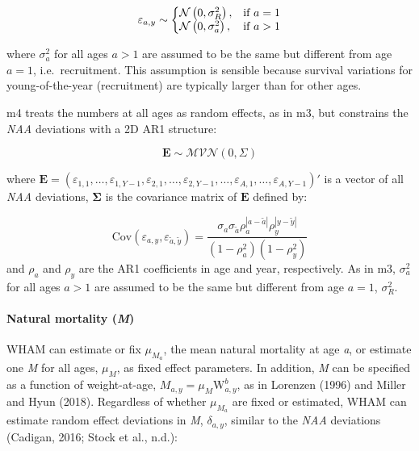 \documentclass[]{article}
\let\oldparagraph\paragraph
\renewcommand{\paragraph}[1]{\oldparagraph{#1}\mbox{}}
\begin{document}
\begin{equation}
  \varepsilon_{a,y} \sim \left\{
    \begin{array}{@{}ll@{}}
      \mathcal{N} \left( 0, \sigma^2_R \right), & \text{if}\ a = 1 \\
      \mathcal{N} \left( 0, \sigma^2_a \right), & \text{if}\ a > 1
    \end{array}\right.
\end{equation}

where \(\sigma^2_a\) for all ages \(a > 1\) are assumed to be the same
but different from age \(a = 1\), i.e.~recruitment. This assumption is
sensible because survival variations for young-of-the-year (recruitment)
are typically larger than for other ages.

m4 treats the numbers at all ages as random effects, as in m3, but
constrains the \emph{NAA} deviations with a 2D AR1 structure:

\[\mathbf{E} \sim \mathcal{MVN} \left( 0, \Sigma \right)\]

where
\(\mathbf{E} = (\varepsilon_{1,1}, \ldots, \varepsilon_{1,Y-1}, \varepsilon_{2,1}, \ldots, \varepsilon_{2,Y-1}, \ldots, \varepsilon_{A,1}, \ldots, \varepsilon_{A,Y-1})'\)
is a vector of all \emph{NAA} deviations, \(\boldsymbol{\Sigma}\) is the
covariance matrix of \(\mathbf{E}\) defined by:

\[ \text{Cov} \left( \varepsilon_{a,y}, \varepsilon_{\tilde{a},\tilde{y}} \right) = \frac{\sigma_a \sigma_{\tilde{a}} \rho^{|a-\tilde{a}|}_{a} \rho^{|y-\tilde{y}|}_{y}}{\left(1-\rho^2_{a}\right) \left(1-\rho^2_{y}\right)}\]
and \(\rho_a\) and \(\rho_y\) are the AR1 coefficients in age and year,
respectively. As in m3, \(\sigma^2_a\) for all ages \(a > 1\) are
assumed to be the same but different from age \(a = 1\), \(\sigma^2_R\).

\hypertarget{natural-mortality-m}{%
\paragraph{\texorpdfstring{Natural mortality
(\emph{M})}{Natural mortality (M)}}\label{natural-mortality-m}}

WHAM can estimate or fix \(\mu_{M_a}\), the mean natural mortality at
age \emph{a}, or estimate one \emph{M} for all ages, \(\mu_M\), as fixed
effect parameters. In addition, \emph{M} can be specified as a function
of weight-at-age, \(M_{a,y} = \mu_M \text{W}^b_{a,y}\), as in Lorenzen
(1996) and Miller and Hyun (2018). Regardless of whether \(\mu_{M_a}\)
are fixed or estimated, WHAM can estimate random effect deviations in
\emph{M}, \(\delta_{a,y}\), similar to the \emph{NAA} deviations
(Cadigan, 2016; Stock et al., n.d.):
\end{document}
